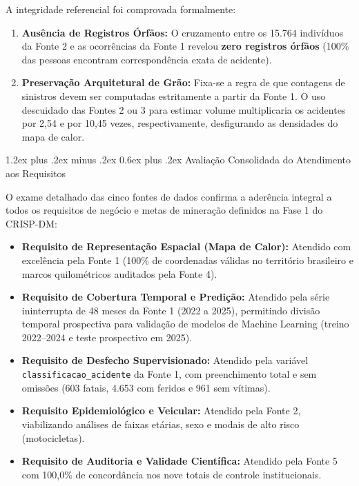 \documentclass[11pt,a4paper]{article}
\makeatletter
\renewcommand\subsection{
\@startsection{subsection}{2}{0pt}%
{1.2ex plus .2ex minus .2ex}%
{0.6ex plus .2ex}%
{\normalfont\large\bfseries\color{secondary}}
}
\makeatother
\begin{document}
A integridade referencial foi comprovada formalmente:
\begin{enumerate}
    \item \textbf{Ausência de Registros Órfãos:} O cruzamento entre os 15.764 indivíduos da Fonte 2 e as ocorrências da Fonte 1 revelou \textbf{zero registros órfãos} (100\% das pessoas encontram correspondência exata de acidente).
    \item \textbf{Preservação Arquitetural de Grão:} Fixa-se a regra de que contagens de sinistros devem ser computadas estritamente a partir da Fonte 1. O uso descuidado das Fontes 2 ou 3 para estimar volume multiplicaria os acidentes por 2,54 e por 10,45 vezes, respectivamente, desfigurando as densidades do mapa de calor.
\end{enumerate}

\subsection{Avaliação Consolidada do Atendimento aos Requisitos}

O exame detalhado das cinco fontes de dados confirma a aderência integral a todos os requisitos de negócio e metas de mineração definidos na Fase 1 do CRISP-DM:
\begin{itemize}
    \item \textbf{Requisito de Representação Espacial (Mapa de Calor):} Atendido com excelência pela Fonte 1 (100\% de coordenadas válidas no território brasileiro e marcos quilométricos auditados pela Fonte 4).
    \item \textbf{Requisito de Cobertura Temporal e Predição:} Atendido pela série ininterrupta de 48 meses da Fonte 1 (2022 a 2025), permitindo divisão temporal prospectiva para validação de modelos de Machine Learning (treino 2022--2024 e teste prospectivo em 2025).
    \item \textbf{Requisito de Desfecho Supervisionado:} Atendido pela variável \texttt{classificacao\_acidente} da Fonte 1, com preenchimento total e sem omissões (603 fatais, 4.653 com feridos e 961 sem vítimas).
    \item \textbf{Requisito Epidemiológico e Veicular:} Atendido pela Fonte 2, viabilizando análises de faixas etárias, sexo e modais de alto risco (motocicletas).
    \item \textbf{Requisito de Auditoria e Validade Científica:} Atendido pela Fonte 5 com 100,0\% de concordância nos nove totais de controle institucionais.
\end{itemize}
\end{document}
